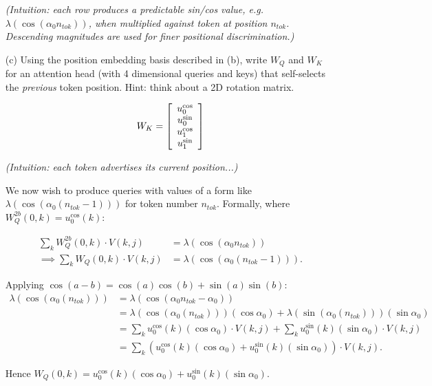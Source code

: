 \documentclass[11pt]{article}
\newenvironment{answerbox}%
  {\begin{mdframed}[linecolor=darkgray,%
                    roundcorner=10pt,innertopmargin=10pt,%
                    innerbottommargin=10pt,skipabove=12pt,skipbelow=12pt]}%
  {\end{mdframed}}
\begin{document}
\begin{itemize}
\begin{answerbox}
\textit{(Intuition: each row produces a predictable sin/cos value, e.g. $\lambda(\cos(\alpha_0 n_{tok}))$, when multiplied against token at position $n_{tok}$. Descending magnitudes are used for finer positional discrimination.)}
\end{answerbox}

    \item[(c)] Using the position embedding basis described in (b), write $W_Q$ and $W_K$ for an attention head (with 4 dimensional queries and keys) that self-selects the \emph{previous} token position. Hint: think about a 2D rotation matrix.

\begin{answerbox}
$$
W_K = \left[
\begin{array}{*{1}c}
u^{\cos}_0 \\
u^{\sin}_0 \\
u^{\cos}_1 \\
u^{\sin}_1 \\
\end{array}
\right]
$$

\textit{(Intuition: each token advertises its current position...)}

We now wish to produce queries with values of a form like $\lambda(\cos(\alpha_0 (n_{tok}-1)))$ for token number $n_{tok}$. Formally, where $W_Q^{2b}(0, k) = u_0^{\cos}(k)$:

\begin{align*}
    \sum_k{W_Q^{2b}(0,k) \cdot V(k,j)} &= \lambda(\cos(\alpha_0 n_{tok})) \\
    \implies \sum_k{W_Q(0,k) \cdot V(k,j)} &= \lambda(\cos(\alpha_0 (n_{tok}-1))).
\end{align*}

Applying $\cos(a-b) = \cos(a) \cos(b) + \sin(a) \sin(b)$:
\begin{align*}
    \lambda(\cos(\alpha_0 (n_{tok}))) &= \lambda(\cos(\alpha_0 n_{tok}-\alpha_0)) \\
    &= \lambda(\cos(\alpha_0 (n_{tok})))(\cos \alpha_0) +  \lambda(\sin(\alpha_0 (n_{tok})))(\sin \alpha_0) \\
    &= \sum_k{ u_0^{\cos}(k) (\cos \alpha_0) \cdot V(k,j)} + \sum_k{ u_0^{\sin}(k) (\sin \alpha_0) \cdot V(k,j)} \\
    &= \sum_k{( u_0^{\cos}(k) (\cos \alpha_0) +  u_0^{\sin}(k) (\sin \alpha_0)) \cdot V(k,j)}.
\end{align*}

Hence $W_Q(0,k) = u_0^{\cos}(k)(\cos \alpha_0) + u_0^{\sin}(k)(\sin \alpha_0)$.


\end{answerbox}
\end{itemize}
\end{document}
